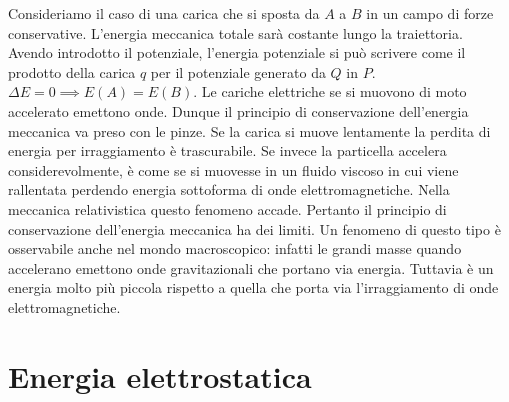 \begin{itemize}
\begin{figure}[htpb]
	\end{figure}
	\FloatBarrier

\end{itemize}

Consideriamo il caso di una carica che si sposta da $A$ a $B$ in un campo di forze conservative. L'energia meccanica totale sarà costante lungo la traiettoria. Avendo introdotto il potenziale, l'energia potenziale si può scrivere come il prodotto della carica $q$ per il potenziale generato da $Q$ in $P$. $ \Delta E = 0 \implies E(A)=E(B) $.
Le cariche elettriche se si muovono di moto accelerato emettono onde. Dunque il principio di conservazione dell'energia meccanica va preso con le pinze. Se la carica si muove lentamente la perdita di energia per irraggiamento è trascurabile. Se invece la particella accelera considerevolmente, è come se si muovesse in un fluido viscoso in cui viene rallentata perdendo energia sottoforma di onde elettromagnetiche. Nella meccanica relativistica questo fenomeno accade. Pertanto il principio di conservazione dell'energia meccanica ha dei limiti. Un fenomeno di questo tipo è osservabile anche nel mondo macroscopico: infatti le grandi masse quando accelerano emettono onde gravitazionali che portano via energia. Tuttavia è un energia molto più piccola rispetto a quella che porta via l'irraggiamento di onde elettromagnetiche.

\section{Energia elettrostatica}

